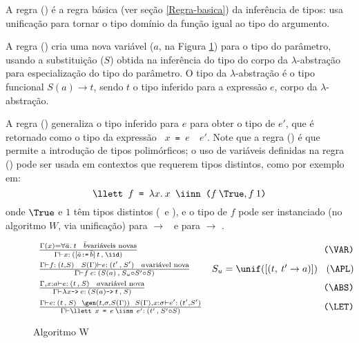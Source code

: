 A regra (\APL) é a regra básica (ver seção \ref{Regra-basica}) da
inferência de tipos: usa unificação para tornar o tipo domínio da
função igual ao tipo do argumento.

A regra (\ABS) cria uma nova variável ($a$, na Figura \ref{Inf-tipos})
para o tipo do parâmetro, usando a substituição ($S$) obtida na
inferência do tipo do corpo da $\lambda$-abstração para especialização
do tipo do parâmetro. O tipo da $\lambda$-abstração é o tipo funcional
$S(a)\rightarrow t$, sendo $t$ o tipo inferido para a expressão $e$,
corpo da $\lambda$-abstração.

A regra (\LET) generaliza o tipo inferido para $e$ para obter o tipo
de $e'$, que é retornado como o tipo da expressão {\tt \llett\ $x$ =
  $e$ \iinn\ $e'$}. Note que a regra (\LET) é que permite a introdução
de tipos polimórficos; o uso de variáveis definidas na regra (\LET)
pode ser usada em contextos que requerem tipos distintos, como por
exemplo em:
\[ \texttt{\llett\ $f$ = $\lambda x.\:x$ \iinn\ ($f\: \True, f\:1$)} \]
onde $\True$ e $1$ têm tipos distintos (\Bool\ e \Integer), e o tipo
de $f$ pode ser instanciado (no algoritmo $W$, via unificação) para
\Bool $\rightarrow$ \Bool\ e para \Integer $\rightarrow$ \Integer.

\begin{figure}
  \[ \begin{array}{lr}
        \frac{\Gamma(x) = \forall\bar{a}.\:t  \:\:\:\: {\bar{b} \textrm{variáveis novas}}}
            {\Gamma \vdash x:\: (\symbol{91}\bar{a} {\texttt{:=}}\,\bar{b}\symbol{93}\,t\,,\:\iid)}
            & \texttt{(\VAR)} \\[.2cm]
        \frac{\Gamma \vdash f: \:(t,S)  \:\:\:\: S(\Gamma) \vdash e:\: (t'\,,\:S') \:\:\:\: a \textrm{variável nova}}
             {\Gamma \vdash f \: e: \:(S(a)\,,\:S_u \circ S' \circ S )}
            & S_u = \unif(\symbol{91}(t,\: t' \rightarrow a)\symbol{93}) \:\:\:\: {\tt (\APL)} \\[.2cm]
        \frac{\Gamma,x:a \vdash e:\:(t\,,\:S) \:\:\:\: a \textrm{variável nova}}
             {\Gamma \vdash \lambda x \texttt{->}\:e:\: (S(a)\texttt{->}\:t\,,\:S)} 
            & \texttt{(\ABS)} \\[.2cm]
        \frac{\Gamma \vdash e:\: (t\,,\:S) \:\:\: \gen(t,\sigma,S(\Gamma)) \:\:\: S(\Gamma),x:\sigma \vdash e':\: (t',S')}
             {\Gamma \vdash \llett\ x {\texttt{ = }} e\: \iinn\ e':\: (t'\,,\:S' \circ S)}
            & \texttt{(\LET)}
     \end{array}
  \]
\caption{Algoritmo W}
\label{Inf-tipos}
\end{figure}

